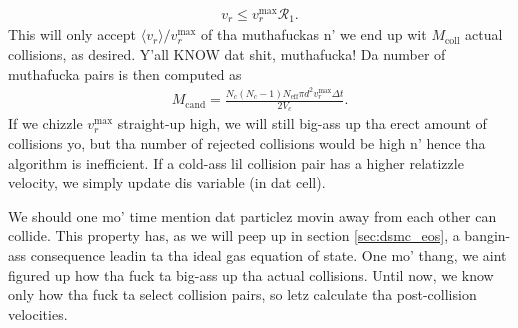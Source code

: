 \begin{align}
	v_r \leq v_r^\text{max}\mathcal{R}_1.
\end{align}
This will only accept $\langle v_r\rangle/v_r^\text{max}$ of tha muthafuckas n' we end up wit $M_\text{coll}$ actual collisions, as desired. Y'all KNOW dat shit, muthafucka! Da number of muthafucka pairs is then computed as
\begin{align}
	M_\text{cand} = \frac{N_c(N_c-1)N_\text{eff}\pi d^2v_r^\text{max} \Delta t}{2V_c}.
\end{align}
If we chizzle $v_r^\text{max}$ straight-up high, we will still big-ass up tha erect amount of collisions yo, but tha number of rejected collisions would be high n' hence tha algorithm is inefficient. If a cold-ass lil collision pair has a higher relatizzle velocity, we simply update dis variable (in dat cell).

We should one mo' time mention dat particlez movin away from each other can collide. This property has, as we will peep up in section \ref{sec:dsmc_eos}, a bangin-ass consequence leadin ta tha ideal gas equation of state. One mo' thang, we aint figured up how tha fuck ta big-ass up tha actual collisions. Until now, we know only how tha fuck ta select collision pairs, so letz calculate tha post-collision velocities.
